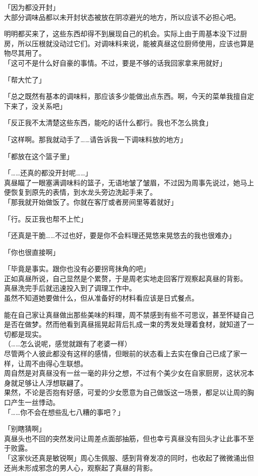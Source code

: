 「因为都没开封」\\

大部分调味品都以未开封状态被放在阴凉避光的地方，所以应该不必担心吧。

明明都买来了，这些东西却得不到展现自己的机会。实际上由于周基本没下过厨房，所以压根就没动过它们。对调味料来说，能被真昼这位厨师使用，应该也算是物尽其用了。\\

「这可不是什么好自豪的事情。不过，要是不够的话我回家拿来用就好」

「帮大忙了」

「总之既然有基本的调味料，那应该多少能做出点东西。啊，今天的菜单我擅自定下来了，没关系吧」

「反正我不太清楚这些东西，能吃的话什么都行。我也不怎么挑食」

「这样啊。那我就动手了……请告诉我一下调味料放的地方」

「都放在这个篮子里」

「……还真的都没开封呢……」\\

真昼瞄了一眼塞满调味料的篮子，无语地皱了皱眉，不过因为周事先说过，她马上便恢复到原先的表情，到水龙头旁边洗起手来了。\\

「那我就开始做饭了。你就在客厅或者房间里等着就好」

「行。反正我也帮不上忙」

「还真是干脆……不过也好，要是你不会料理还晃悠来晃悠去的我也很难办」

「你也很直接啊」

「毕竟是事实。跟你也没有必要拐弯抹角的吧」\\

正如真昼所说，自己显然是个累赘，于是周老实地走回客厅观察起真昼的背影。\\

真昼洗完手后就迅速投入到了调理工作中。\\

虽然不知道她要做什么，但从准备好的材料看应该是日式餐点。

能在自己家让真昼做出那些美味的料理，周不禁感到有些不可思议，甚至怀疑自己是否在做梦。然而他看到真昼摇晃起背后扎成一束的秀发处理着食材，就知道了一切都是现实。\\

（……怎么说呢，感觉就跟有了老婆一样）\\

尽管两个人彼此都没有这样的感情，但眼前的状态看上去实在像自己已成了家一样，让周不由得心生联想。\\

周自然是对真昼没有一丝一毫的非分之想，不过有个美少女在自家厨房，这状况本身就足够让人浮想联翩了。\\

果然，不论是否抱有好感，可爱的少女愿意为自己做饭这一场景，都足以让周的胸口产生一丝悸动。\\

「……你不会在想些乱七八糟的事吧？」

「别瞎猜啊」\\

真昼头也不回的突然发问让周差点面部抽筋，但也幸亏真昼没有回头才让此事不至于败露。\\

「这家伙还真是敏锐啊」周心生佩服、感到背脊发凉的同时，也收起了微微涌出但还尚未形成邪念的男人心，观察起了真昼的背影。
